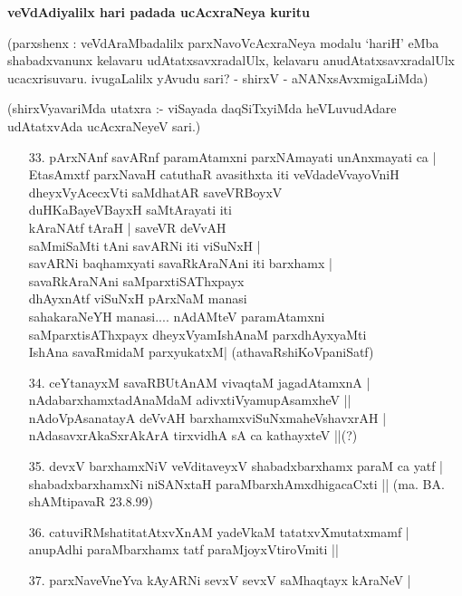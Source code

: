 \noindent
{\bf\large{veVdAdiyalilx hari padada ucAcxraNeya kuritu}}\label{page149}

(parxshenx : veVdAraMbadalilx parxNavoVcAcxraNeya modalu `hariH' eMba shabadxvanunx kelavaru udAtatxsavxradalUlx, kelavaru anudAtatxsavxradalUlx ucacxrisuvaru. ivugaLalilx yAvudu sari? - shirxV - aNANxsAvxmigaLiMda)

(shirxVyavariMda utatxra :- viSayada daqSiTxyiMda heVLuvudAdare udAtatxvAda ucAcxraNeyeV sari.)

\begin{itemize}
\item[33.] pArxNAnf savARnf paramAtamxni parxNAmayati unAnxmayati ca |\\\label{149}
EtasAmxtf parxNavaH catuthaR avasithxta iti veVdadeVvayoVniH \\
dheyxVyAcecxVti saMdhatAR saveVRBoyxV \\
duHKaBayeVBayxH saMtArayati iti \\
kAraNAtf tAraH | saveVR deVvAH \\
saMmiSaMti tAni savARNi iti viSuNxH |\\
savARNi baqhamxyati savaRkAraNAni iti barxhamx |\\
savaRkAraNAni saMparxtiSAThxpayx \\
dhAyxnAtf viSuNxH pArxNaM manasi \\
sahakaraNeYH manasi.... nAdAMteV paramAtamxni\\
saMparxtisAThxpayx dheyxVyamIshAnaM parxdhAyxyaMti\\
IshAna savaRmidaM parxyukatxM|\label{102}
\hfill{(athavaRshiKoVpaniSatf)}
\item[34.] ceYtanayxM savaRBUtAnAM vivaqtaM jagadAtamxnA |\\\label{149}
nAdabarxhamxtadAnaMdaM adivxtiVyamupAsamxheV ||\\
nAdoVpAsanatayA deVvAH barxhamxviSuNxmaheVshavxrAH |\\
nAdasavxrAkaSxrAkArA tirxvidhA sA ca kathayxteV ||\quad(?)\label{149}
\item[35.] devxV barxhamxNiV veVditaveyxV shabadxbarxhamx paraM ca yatf |\\\label{149}
shabadxbarxhamxNi niSANxtaH paraMbarxhAmxdhigacaCxti ||\label{160}
\hfill{(ma. BA. shAMtipavaR 23.8.99)}
\item[36.] catuviRMshatitatAtxvXnAM yadeVkaM tatatxvXmutatxmamf |\\\label{150}
anupAdhi paraMbarxhamx tatf paraMjoyxVtiroVmiti ||
\item[37.] parxNaveVneYva kAyARNi sevxV sevxV saMhaqtayx kAraNeV |\\\label{150}

\end{itemize}
